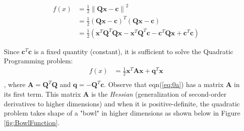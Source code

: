 \documentclass[a4paper]{article}
\begin{document}
\begin{equation} \label{eq:0}
\begin{split}
f(x) & = \frac{1}{2} \left\lVert \mathbf{Q} \boldsymbol{x} - \boldsymbol{c} \right\lVert ^2 \\
& = \frac{1}{2} (\mathbf{Q} \boldsymbol{x} - \boldsymbol{c})^T  (\mathbf{Q} \boldsymbol{x} - \boldsymbol{c}) \\
& = \frac{1}{2} (\boldsymbol{x}^T \mathbf{Q}^T \mathbf{Q} \boldsymbol{x} - \boldsymbol{x}^T \mathbf{Q}^T \boldsymbol{c} - \boldsymbol{c}^T \mathbf{Q} \boldsymbol{x} + \boldsymbol{c}^T \boldsymbol{c})
\end{split}
\end{equation}

\noindent Since $\boldsymbol{c}^T \boldsymbol{c}$ is a fixed quantity (constant), it is sufficient to solve the Quadratic Programming problem:
\begin{equation} \label{eq:0a}
\begin{split}
f(x) & = \frac{1}{2} \boldsymbol{x}^T \mathbf{A} \boldsymbol{x} + \boldsymbol{q}^T \boldsymbol{x} \\
\end{split}
\end{equation}, where $\mathbf{A} = \mathbf{Q}^T \mathbf{Q}$ and $\boldsymbol{q} = - \mathbf{Q}^T \boldsymbol{c}$. Observe that eqn(\ref{eq:0a}) has a matrix $\mathbf{A}$ in its first term. This matrix $\mathbf{A}$ is the {\it Hessian} (generalization of second-order derivatives to higher dimensions) and when it is positive-definite, the quadratic problem takes shape of a "bowl" in higher dimensions as shown below in Figure \ref{fig:BowlFunction}.
\end{document}
